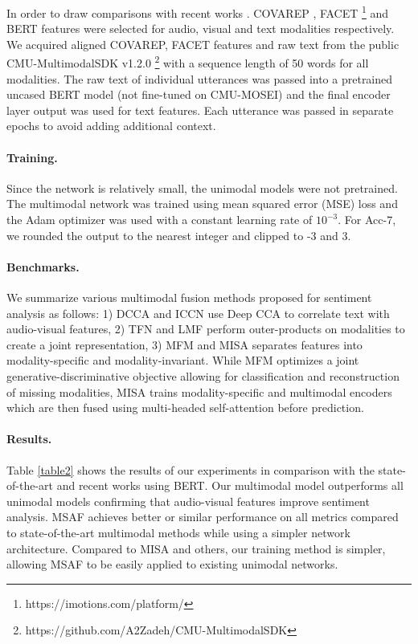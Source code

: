 \documentclass[10pt,twocolumn,letterpaper]{article}
\begin{document}
In order to draw comparisons with recent works \cite{sun2019learning,hazarika2020misa}. COVAREP \cite{coverap}, FACET \footnote{https://imotions.com/platform/} and BERT \cite{devlin2018bert} features were selected for audio, visual and text modalities respectively. We acquired aligned COVAREP, FACET features and raw text from the public CMU-MultimodalSDK v1.2.0 \footnote{https://github.com/A2Zadeh/CMU-MultimodalSDK} with a sequence length of 50 words for all modalities. The raw text of individual utterances was passed into a pretrained uncased BERT model (not fine-tuned on CMU-MOSEI) and the final encoder layer output was used for text features. Each utterance was passed in separate epochs to avoid adding additional context. 

\paragraph{Training.}
Since the network is relatively small, the unimodal models were not pretrained. The multimodal network was trained using mean squared error (MSE) loss and the Adam optimizer was used with a constant learning rate of $10^{-3}$. For Acc-7, we rounded the output to the nearest integer and clipped to -3 and 3.

\paragraph{Benchmarks.}
We summarize various multimodal fusion methods proposed for sentiment analysis as follows: 1) DCCA \cite{sun2019multimodal} and ICCN \cite{sun2019learning} use Deep CCA to correlate text with audio-visual features, 2) TFN \cite{zadeh2017tfn} and LMF \cite{8752006lmf} perform outer-products on modalities to create a joint representation, 3) MFM \cite{tsai2018learning} and MISA \cite{hazarika2020misa} separates features into modality-specific and modality-invariant. While MFM optimizes a joint generative-discriminative objective allowing for classification and reconstruction of missing modalities, MISA trains modality-specific and multimodal encoders which are then fused using multi-headed self-attention before prediction.

\paragraph{Results.} 
Table \ref{table2} shows the results of our experiments in comparison with the state-of-the-art and recent works using BERT. Our multimodal model outperforms all unimodal models confirming that audio-visual features improve sentiment analysis. MSAF achieves better or similar performance on all metrics compared to state-of-the-art multimodal methods while using a simpler network architecture. Compared to MISA and others, our training method is simpler, allowing MSAF to be easily applied to existing unimodal networks.
\end{document}
